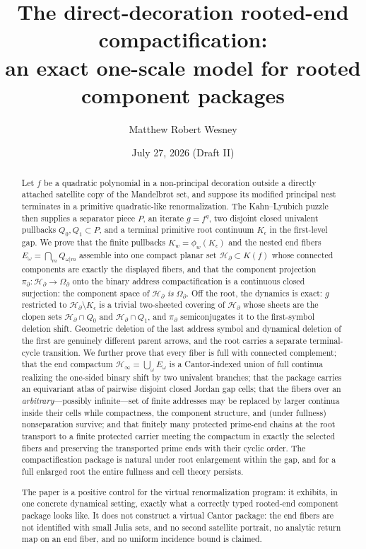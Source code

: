 \documentclass[11pt,reqno]{amsart}
\title[Direct-decoration rooted-end compactification]{The direct-decoration
rooted-end compactification:\\ an exact one-scale model for rooted
component packages}
\author{Matthew Robert Wesney}
\date{July 27, 2026 (Draft II)}
\numberwithin{equation}{section}
\theoremstyle{plain}
\theoremstyle{definition}
\theoremstyle{remark}
\newcommand{\OmB}{\Omega_\partial}
\newcommand{\HB}{\mathcal H_\partial}
\newcommand{\HE}{\mathcal H_\infty}
\newcommand{\rootK}{K_{\epsilon}}
\newcommand{\projB}{\pi_\partial}
\begin{document}
\begin{abstract}
Let $f$ be a quadratic polynomial in a non-principal decoration outside a
directly attached satellite copy of the Mandelbrot set, and suppose its
modified principal nest terminates in a primitive quadratic-like
renormalization.  The Kahn--Lyubich puzzle then supplies a separator
piece $P$, an iterate $g=f^q$, two disjoint closed univalent pullbacks
$Q_0,Q_1\subset P$, and a terminal primitive root continuum $\rootK$ in
the first-level gap.  We prove that the finite pullbacks
$K_w=\phi_w(\rootK)$ and the nested end fibers
$E_\omega=\bigcap_mQ_{\omega|m}$ assemble into one compact planar set
$\HB\subset K(f)$ whose connected components are exactly the displayed
fibers, and that the component projection
$\projB\colon\HB\to\OmB$ onto the binary address compactification is a
continuous closed surjection: the component space of $\HB$ \emph{is}
$\OmB$.  Off the root, the dynamics is exact: $g$ restricted to
$\HB\setminus\rootK$ is a trivial two-sheeted covering of $\HB$ whose
sheets are the clopen sets $\HB\cap Q_0$ and $\HB\cap Q_1$, and $\projB$
semiconjugates it to the first-symbol deletion shift.  Geometric
deletion of the last address symbol and dynamical deletion of the first
are genuinely different parent arrows, and the root carries a separate
terminal-cycle transition.  We further prove that every fiber is full
with connected complement; that the end compactum
$\HE=\bigcup_\omega E_\omega$ is a Cantor-indexed union of full continua
realizing the one-sided binary shift by two univalent branches; that the
package carries an equivariant atlas of pairwise disjoint closed Jordan
gap cells; that the fibers over an \emph{arbitrary}---possibly
infinite---set of finite addresses may be replaced by larger continua
inside their cells while compactness, the component structure, and
(under fullness) nonseparation survive; and that finitely many protected
prime-end chains at the root transport to a finite protected carrier
meeting the compactum in exactly the selected fibers and preserving the
transported prime ends with their cyclic order.  The compactification
package is natural under root enlargement within the gap, and for a
full enlarged root the entire fullness and cell theory persists.

The paper is a positive control for the virtual renormalization
program: it exhibits, in one concrete dynamical setting, exactly what a
correctly typed rooted-end component package looks like.  It does not
construct a virtual Cantor package: the end fibers are not identified
with small Julia sets, and no second satellite portrait, no analytic
return map on an end fiber, and no uniform incidence bound is claimed.
\end{abstract}
\end{document}

